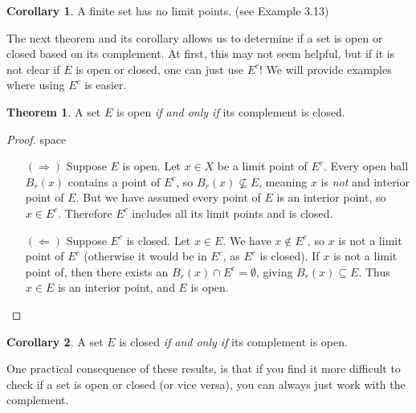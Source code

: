 \documentclass{article}
\theoremstyle{definition}
\newtheorem{theorem}{Theorem}[section]
\newtheorem{corollary}{Corollary}[section]
\begin{document}
	\begin{corollary}
		A finite set has no limit points. (see Example 3.13)
	\end{corollary}
	The next theorem and its corollary allows us to determine if a set is open or closed based on its complement. At first, this may not seem helpful, but if it is not clear if $ E $ is open or closed, one can just use $ E^c $! We will provide examples where using $ E^c $ is easier.
	\begin{theorem}
		A set $ E $ is open \textit{if and only if} its complement is closed.
	\end{theorem}
	\begin{proof}{\color{white}space}
		\begin{enumerate}
			\item [$ (\Longrightarrow) $] Suppose $ E $ is open. Let $ x\in X $ be a limit point of $ E^c $. Every open ball $ B_r(x) $ contains a point of $ E^c $, so $ B_r(x)\not\subseteq E $, meaning $ x $ is \textit{not} and interior point of $ E $. But we have assumed every point of $ E $ is an interior point, so $ x\in E^c $. Therefore $ E^c $ includes all its limit points and is closed.   
			\item [$ (\Longleftarrow) $] Suppose $ E^c $ is closed. Let $ x\in E $. We have $ x\notin E^c $, so $ x $ is not a limit point of $ E^c $ (otherwise it would be in $ E^c $, as $ E^c $ is closed). If $ x $ is not a limit point of, then there exists an $ B_r(x)\cap E^c=\emptyset $, giving $ B_r(x)\subseteq E $. Thus $ x\in E $ is an interior point, and $ E $ is open.  
		\end{enumerate}
	\end{proof}
	\begin{corollary}
		A set $ E $ is closed \textit{if and only if} its complement is open.
	\end{corollary}
	One practical consequence of these results, is that if you find it more difficult to check if a set is open or closed (or vice versa), you can always just work with the complement. 
	
\end{document}
